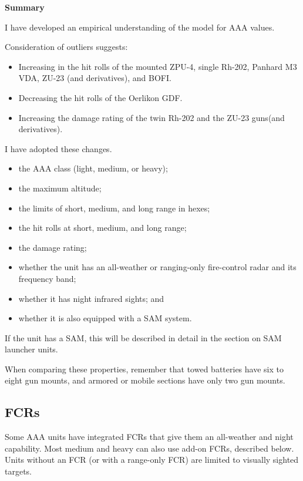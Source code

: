 \documentclass[10pt]{article}
\newcommand{\notesection}[1]{%
    \par{\bfseries #1}\par
}
\newcommand{\clearnotes}{\clearpage}
\begin{document}
{    \notesection{Summary}

    I have developed an empirical understanding of the model for AAA values.

    Consideration of outliers suggests:
    \begin{itemize}
        \item Increasing in the hit rolls of the mounted ZPU-4, single Rh-202, Panhard M3 VDA, ZU-23 (and derivatives), and BOFI.
        \item Decreasing the hit rolls of the Oerlikon GDF.
        \item Increasing the damage rating of the twin Rh-202 and the ZU-23 guns(and derivatives).
    \end{itemize}
    I have adopted these changes.

}
\clearnotes

\begin{itemize}
    \item the AAA class (light, medium, or heavy);
    \item the maximum altitude;
    \item the limits of short, medium, and long range in hexes;
    \item the hit rolls at short, medium, and long range;
    \item the damage rating;
    \item whether the unit has an all-weather or ranging-only fire-control radar and its frequency band;
    \item whether it has night infrared sights; and
    \item whether it is also equipped with a SAM system.
\end{itemize}

If the unit has a SAM, this will be described in detail in the section on SAM launcher units.

When comparing these properties, remember that towed batteries have six to eight gun mounts, and armored or mobile sections have only two gun mounts.

\subsection{FCRs}

Some AAA units have integrated FCRs that give them an all-weather and night capability.
Most medium and heavy can also use add-on FCRs, described below.
Units without an FCR (or with a range-only FCR) are limited to visually sighted targets.
\end{document}
